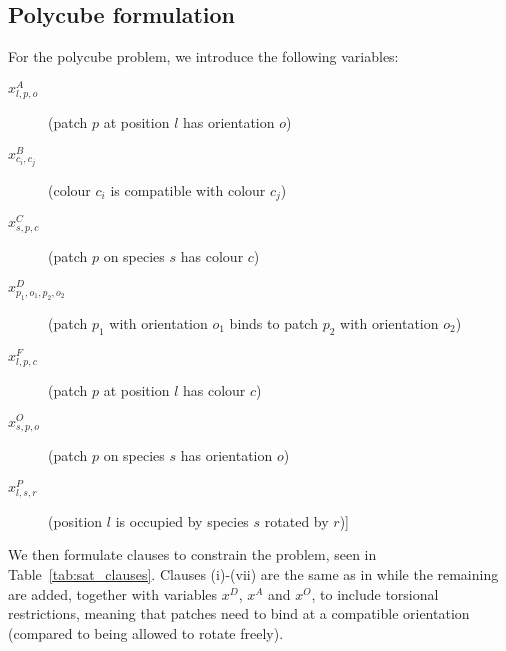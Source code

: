 \subsection{Polycube formulation}

For the polycube problem, we introduce the following variables:
\begin{description}
    \item[\(x_{l,p,o}^{A}\)] (patch \(p\) at position \(l\) has orientation \(o\))
    \item[\(x_{c_i,c_j}^{B}\)] (colour \(c_i\) is compatible with colour \(c_j\))
    \item[\(x_{s,p,c}^{C}\)] (patch \(p\) on species \(s\) has colour \(c\))
    \item[\(x_{p_1,o_1,p_2,o_2}^{D}\)] (patch \(p_1\) with orientation \(o_1\) binds to patch \(p_2\) with orientation \(o_2\))
    \item[\(x_{l,p,c}^{F}\)] (patch \(p\) at position \(l\) has colour \(c\))
    \item[\(x_{s,p,o}^{O}\)] (patch \(p\) on species \(s\) has orientation \(o\))
    \item[\(x_{l,s,r}^{P}\)] (position \(l\) is occupied by species \(s\) rotated by \(r\))] 
\end{description}

We then formulate clauses to constrain the problem, seen in Table~\ref{tab:sat_clauses}. Clauses (i)-(vii) are the same as in \cite{romano2020designing} while the remaining are added, together with variables \(x^D\), \(x^A\) and \(x^O\), to include torsional restrictions, meaning that patches need to bind at a compatible orientation (compared to being allowed to rotate freely).

